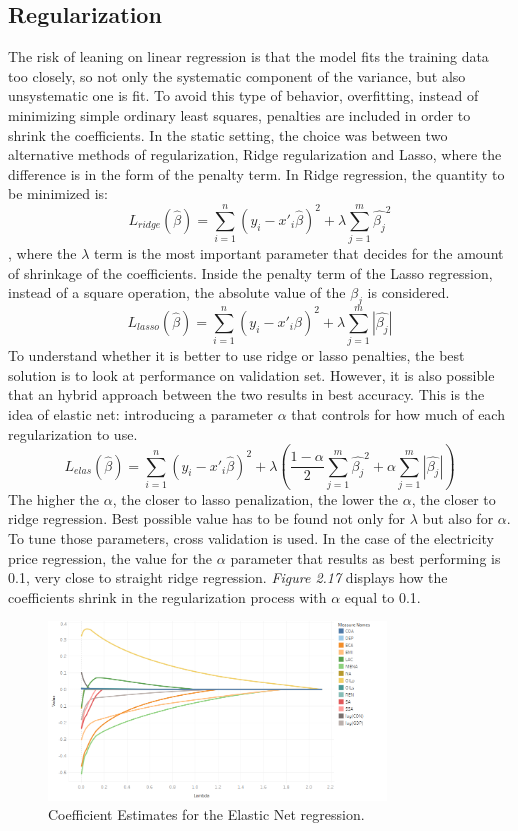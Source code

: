 \documentclass{book}
\begin{document}
\subsection{Regularization}

The risk of leaning on linear regression is that the model fits the training data too closely, so not only the systematic component of the variance, but also unsystematic one is fit. To avoid this type of behavior, overfitting, instead of minimizing simple ordinary least squares, penalties are included in order to shrink the coefficients. In the static setting, the choice was between two alternative methods of regularization, Ridge regularization and Lasso, where the difference is in the form of the penalty term. In Ridge regression, the quantity to be minimized is: $$L_{ridge}(\hat{\beta}) = \sum\limits_{i=1}^{n}(y_i-x'_i\hat{\beta})^2 + \lambda\sum\limits_{j=1}^{m}\hat{\beta_j}^2$$, where the $\lambda$ term is the most important parameter that decides for the amount of shrinkage of the coefficients. Inside the penalty term of the Lasso regression, instead of a square operation, the absolute value of the $\beta_j$ is considered. $$L_{lasso}(\hat{\beta}) = \sum\limits_{i=1}^{n}(y_i-x'_i\hat{\beta})^2 + \lambda\sum\limits_{j=1}^{m}|\hat{\beta_j}|$$ To understand whether it is better to use ridge or lasso penalties, the best solution is to look at performance on validation set. However, it is also possible that an hybrid approach between the two results in best accuracy. This is the idea of elastic net: introducing a parameter $\alpha$ that controls for how much of each regularization to use. $$L_{elas}(\hat{\beta}) = \sum\limits_{i=1}^{n}(y_i-x'_i\hat{\beta})^2 + \lambda(\frac{1-\alpha}{2}\sum\limits_{j=1}^{m}\hat{\beta_j}^2 + \alpha\sum\limits_{j=1}^{m}|\hat{\beta_j}|)$$ The higher the $\alpha$, the closer to lasso penalization, the lower the $\alpha$, the closer to ridge regression. Best possible value has to be found not only for $\lambda$ but also for $\alpha$. To tune those parameters, cross validation is used. In the case of the electricity price regression, the value for the $\alpha$ parameter that results as best performing is 0.1, very close to straight ridge regression. \textit{Figure 2.17} displays how the coefficients shrink in the regularization process with $\alpha$ equal to 0.1.

\bigskip
\begin{figure}[H]
\begin{center}
\captionsetup{justification=centering}
\includegraphics[width=0.8\textwidth]{Images/elastic.png}
\caption{Coefficient Estimates for the Elastic Net regression.}
\end{center}
\end{figure}
\bigskip
\end{document}
